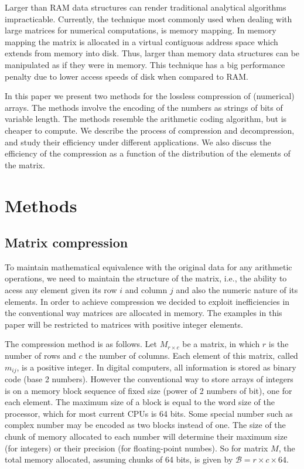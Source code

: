 \documentclass[10pt]{article}
\begin{document}
Larger than RAM data structures can render traditional analytical algorithms impracticable. Currently, the technique most commonly used when dealing with large matrices for numerical computations, is memory mapping\cite{van2011numpy,big}. In memory mapping the matrix is allocated in a virtual contiguous address space which extends from memory into disk. Thus, larger than memory data structures can be manipulated as if they were in memory.  This technique has a big performance penalty due to lower access speeds of disk when compared to RAM. 

In this paper we present two methods for the lossless compression of (numerical) arrays. The methods involve the encoding of the numbers as strings of bits of variable length. The methods resemble the arithmetic coding\cite{bodden2007arithmetic} algorithm, but is cheaper to compute. We describe the process of compression and decompression, and study their efficiency under different applications. We also discuss the efficiency of the compression as a function of the distribution of the elements of the matrix. 

\section*{Methods}

\subsection*{Matrix compression}

To maintain mathematical equivalence with the original data for any arithmetic operations, we need to  maintain the structure of the matrix, i.e., the ability to acess any element given its row $i$ and column $j$ and also the numeric nature of its elements. In order to achieve compression we decided to exploit inefficiencies in the conventional way matrices are allocated in memory. The examples in this paper will be restricted to matrices with positive integer elements.

The compression method is as follows. Let $M_{r \times c}$ be a matrix, in which $r$ is the number of rows and $c$ the number of columns. Each element of this matrix, called $m_{ij}$, is a positive integer. In digital computers, all information is stored as binary code (base 2 numbers). However the conventional way to store arrays of integers is on a memory block sequence of fixed size (power of 2 numbers of bit), one for each element. The maximum size of a block is equal to the word size of the processor, which for most current CPUs is 64 bits. Some special number such as complex number may be encoded as two blocks instead of one. The size of the chunk of memory allocated to each number will determine their maximum  size (for integers) or their precision (for floating-point numbes). So for matrix $M$, the total memory allocated, assuming chunks of 64 bits, is given by $\mathcal{B} = r \times c \times 64$.
\end{document}
